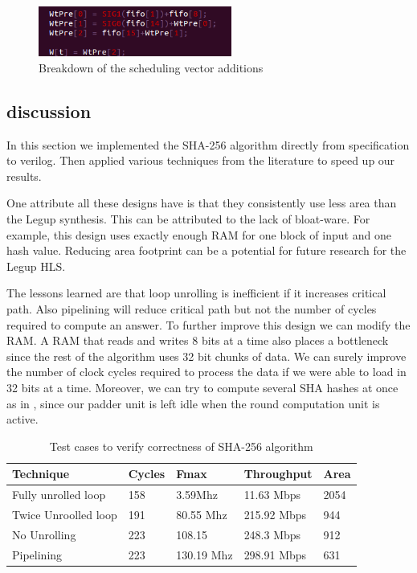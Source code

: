 \documentclass[conference]{IEEEtran}
\begin{document}
\begin{figure}[!t]
\centering
\includegraphics[width=2.5in]{wshcedpip}
\caption{Breakdown of the scheduling vector additions}
\label{fig:wschedpip}
\end{figure}

\subsection{discussion}
In this section we implemented the SHA-256 algorithm directly from specification to verilog. Then applied various techniques from the literature to speed up our results. 

One attribute all these designs have is that they consistently use less area than the Legup synthesis. This can be attributed to the lack of bloat-ware. For example, this design uses exactly enough RAM for one block of input and one hash value. Reducing area footprint can be a potential for future research for the Legup HLS.

 The lessons learned are that loop unrolling is inefficient if it increases critical path. Also pipelining will reduce critical path but not the number of cycles required to compute an answer. To further improve this design we can modify the RAM. A RAM that reads and writes 8 bits at a time also places a bottleneck since the rest of the algorithm uses 32 bit chunks of data. We can surely improve the number of clock cycles required to process the data if we were able to load in 32 bits at a time. Moreover, we can try to compute several SHA hashes at once as in \cite{michail}, since our padder unit is left idle when the round computation unit is active.



\begin{table}
\begin{center}
	\caption{Test cases to verify correctness of SHA-256 algorithm}
    \begin{tabular}{| l | l | l | l | l |}
    \hline
    \label{tab:hardware}
    Technique 	 & Cycles & Fmax & Throughput & Area \\ \hline\hline
	Fully unrolled loop & 158 & 3.59Mhz & 11.63 Mbps & 2054  \\ \hline
	Twice Unroolled loop & 191 & 80.55 Mhz & 215.92 Mbps & 944 \\ \hline
	No Unrolling	 & 223 &  108.15 & 248.3 Mbps &  912 \\ \hline
	Pipelining & 223 & 130.19 Mhz & 298.91 Mbps &  631 \\ \hline
	
    \hline 
    \end{tabular} 
\end{center}  
\end{table}
\end{document}
